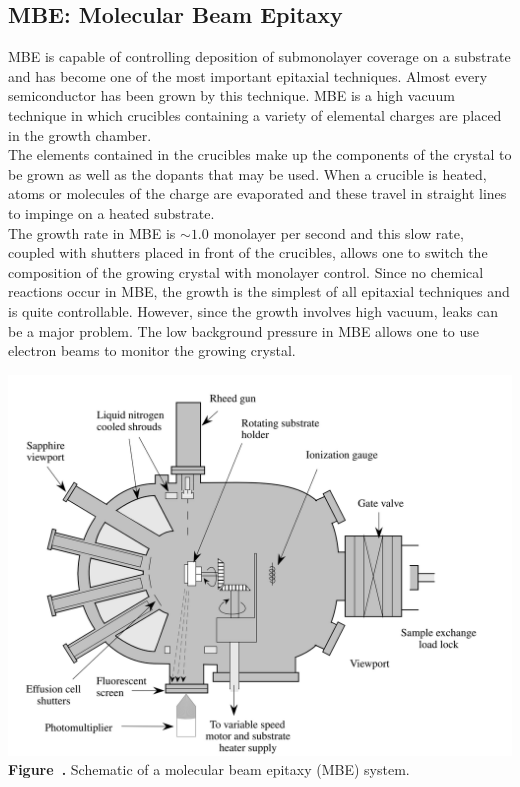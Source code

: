\subsection{MBE: Molecular Beam Epitaxy}
MBE is capable of controlling deposition of submonolayer coverage on a substrate and has become one of the most important epitaxial techniques. Almost every semiconductor
has been grown by this technique. MBE is a high vacuum technique in which crucibles containing a variety of elemental charges are placed in the growth chamber.\\
The elements contained in the crucibles make up the components of the crystal to be grown as well as the dopants that may be used. When a crucible is heated, atoms or molecules of the charge are evaporated and these travel in straight lines to impinge on a heated substrate. \\
The growth rate in MBE is $\sim 1.0$ monolayer per second and this slow rate, coupled with shutters placed in front of the crucibles, allows one to switch the composition of the growing crystal with monolayer control. Since no chemical reactions occur in MBE,
the growth is the simplest of all epitaxial techniques and is quite controllable. However, since the growth involves high vacuum, leaks can be a major problem.
The low background pressure in MBE allows one to use electron beams to monitor the growing crystal.
\begin{center}
	\begin{minipage}{0.63\textwidth}
		\centering
		\includegraphics[width=\textwidth]{img/MBE.png}
		\\[0.5em]
		\textbf{Figure~\thefigure.} Schematic of a molecular beam epitaxy (MBE) system.
		\label{fig:MBE}
	\end{minipage}
\end{center}

